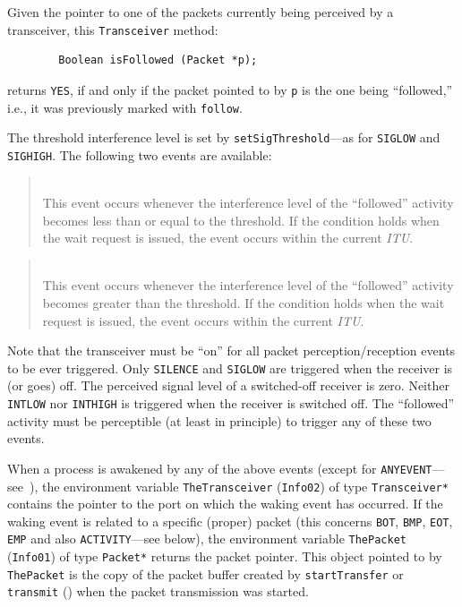 Given the pointer to one of the packets currently being perceived by a
transceiver, this {\tt Transceiver} method:
\begin{verbatim}
        Boolean isFollowed (Packet *p);
\end{verbatim}
returns {\tt YES}, if and only if the packet pointed to by {\tt p} is the one
being ``followed,''
i.e., it was previously marked with {\tt follow}.

The threshold interference level is set by {\tt setSigThreshold}---as for
{\tt SIGLOW} and {\tt SIGHIGH}.
The following two events are available:

\begin{quote}
\noindent{}\\ \hspace{0in}
This event occurs whenever the interference level of the ``followed''
activity becomes less than or equal to the threshold.
If the condition holds when the wait request is issued, the event occurs
within the current {\em ITU}.
\end{quote}

\begin{quote}
\noindent{}\\ \hspace{0in}
This event occurs whenever the interference level of the ``followed''
activity becomes greater than the threshold.
If the condition holds when the wait request is issued, the event occurs
within the current {\em ITU}.
\end{quote}

Note that the transceiver must be ``on'' for all packet perception/reception
events to be ever triggered.
Only {\tt SILENCE} and {\tt SIGLOW} are triggered when the receiver is
(or goes) off.
The perceived signal level of a switched-off receiver is zero.
Neither {\tt INTLOW} nor {\tt INTHIGH} is triggered when the receiver is
switched off.
The ``followed'' activity must be perceptible (at least in principle) to
trigger any of these two events.

When a process is awakened by any of the above events (except for
{\tt ANYEVENT}---see~),
the environment variable {\tt TheTransceiver} ({\tt Info02}) of type
{\tt Transceiver*} contains the pointer
to the port on which the waking event has occurred.
If the waking event is related to a specific (proper) packet
(this concerns {\tt BOT}, {\tt BMP}, {\tt EOT}, {\tt EMP} and also
{\tt ACTIVITY}---see below),
the environment variable {\tt ThePacket} ({\tt Info01}) of type {\tt Packet*}
returns the packet pointer.
This object pointed to by {\tt ThePacket} is the copy
of the packet buffer created by {\tt startTransfer}
or {\tt transmit} ()
when the packet transmission was started.

